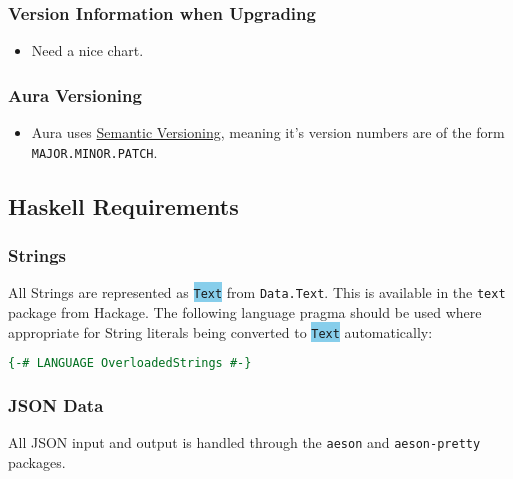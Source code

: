 \documentclass{article}
\begin{document}
\subsubsection{Version Information when
Upgrading}\label{version-information-when-upgrading}

\begin{itemize}
\itemsep1pt\parskip0pt
\item
  Need a nice chart.
\end{itemize}

\subsubsection{Aura Versioning}\label{aura-versioning}

\begin{itemize}
\itemsep1pt\parskip0pt
\item
  Aura uses \href{http://semver.org/}{Semantic Versioning}, meaning it's
  version numbers are of the form \texttt{MAJOR.MINOR.PATCH}.
\end{itemize}

\subsection{Haskell Requirements}\label{haskell-requirements}

\subsubsection{Strings}\label{strings}
All Strings are represented as \colorbox{SkyBlue}{\texttt{Text}} from
\texttt{Data.Text}.
This is available in the \texttt{text} package from Hackage. The following
language pragma should be used where appropriate for String literals being
converted to \colorbox{SkyBlue}{\texttt{Text}} automatically:

\begin{shaded}
\begin{lstlisting}[language=haskell]
{-# LANGUAGE OverloadedStrings #-}
\end{lstlisting}
\end{shaded}


\subsubsection{JSON Data}\label{json-data}
All JSON input and output is handled through the \texttt{aeson} and
\texttt{aeson-pretty} packages.
\end{document}
